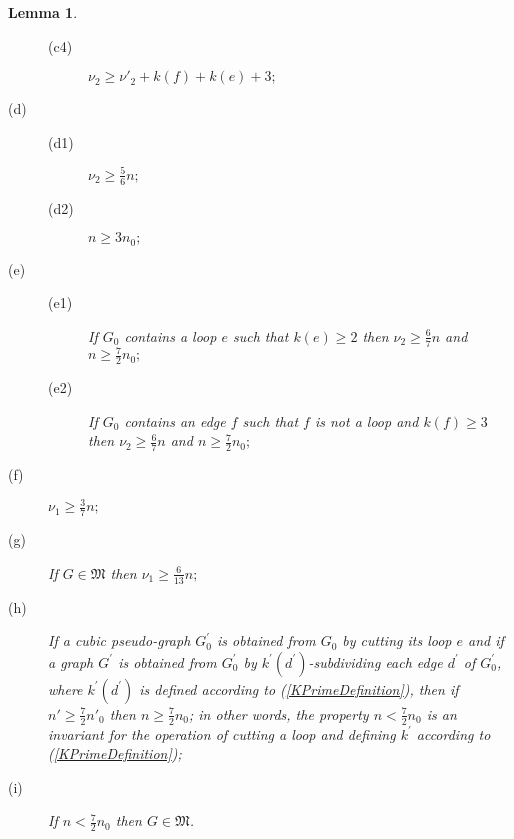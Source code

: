 \documentclass[fleqn,12pt,twoside]{article}
\newtheorem{lemma}{Lemma}
\begin{document}
\begin{lemma}
\begin{description}
\begin{description}
\item[(c4)] $\nu _{2}\geq \nu' _{2}+k(f)+k(e)+3;$
\end{description}

\item[(d)]

\begin{description}
\item[(d1)] $\nu _{2}\geq \frac{5}{6}n ;$

\item[(d2)] $n \geq 3n_0;$
\end{description}

\item[(e)]

\begin{description}
\item[(e1)] If $G_{0}$ contains a loop $e$ such that $k(e)\geq 2$ then $\nu
_{2}\geq \frac{6}{7}n $ and $n \geq \frac{7}{2}n_0;$

\item[(e2)] If $G_{0}$ contains an edge $f$ such that $f$ is not a loop and $k(f)\geq 3$ then $\nu _{2}\geq \frac{6}{7}n$ and $n \geq
\frac{7}{2}n_0;$
\end{description}

\item[(f)] $\nu _{1}\geq \frac{3}{7}n ;$

\item[(g)] If $G\in \mathfrak{M}$ then $\nu _{1}\geq \frac{6}{13}n ;$

\item[(h)] If a cubic pseudo-graph $G_{0}^{\prime }$ is obtained from $G_{0}$
by cutting its loop $e$ and if a graph $G^{\prime }$ is obtained from $G_{0}^{\prime }$ by $k^{\prime }(d^{\prime })$-subdividing each edge $d^{\prime }$ of $G_{0}^{\prime }$, where $k^{\prime }(d^{\prime })$
is defined according to (\ref{KPrimeDefinition}), then if $n' \geq
\frac{7}{2}n'_0 $ then $n \geq \frac{7}{2}n_0$; in other words, the
property $n <\frac{7}{2}n_0 $ is an invariant
for the operation of cutting a loop and defining $k^{\prime }$ according to (\ref{KPrimeDefinition});

\item[(i)] If $n <\frac{7}{2}n_0 $ then $G\in \mathfrak{M}$.
\end{description}
\end{lemma}
\end{document}
